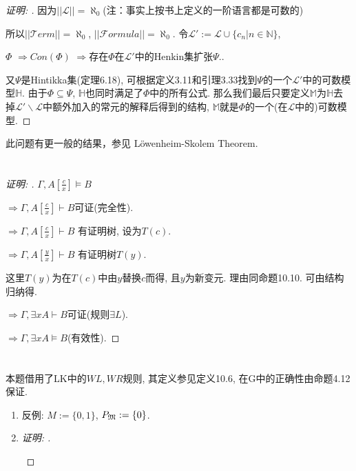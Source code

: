 \documentclass{article}
\begin{document}
\begin{CJK*}{UTF8}{gbsn}
\begin{proof}[\emph{证明: }]
因为$||\mathscr{L}|| = \aleph_0$(注：事实上按书上定义的一阶语言都是可数的)

所以$||\mathcal{T}erm|| = \aleph_0$, $||\mathcal{F}ormula|| = \aleph_0$. 
令$\mathscr{L'} := \mathscr{L} \cup \{c_n | n \in \mathbb{N}\}$,

$\Phi$
$\Rightarrow Con(\Phi)$
$\Rightarrow \text{存在}\Phi\text{在}\mathscr{L'}\text{中的Henkin集扩张}\Psi. $. 

又$\Psi$是Hintikka集(定理6.18), 可根据定义3.11和引理3.33找到$\Psi$的一个$\mathscr{L'}$中的可数模型$\mathbb{H}$. 由于$\Phi \subseteq \Psi$, $\mathbb{H}$也同时满足了$\Phi$中的所有公式. 那么我们最后只要定义$\mathbb{M}$为$\mathbb{H}$去掉$\mathscr{L'} \backslash \mathscr{L}$中额外加入的常元的解释后得到的结构, $\mathbb{M}$就是$\Phi$的一个(在$\mathscr{L}$中的)可数模型. 
\end{proof}

此问题有更一般的结果，参见 L\"owenheim-Skolem Theorem. 
\section{}
\begin{proof}[\emph{证明: }]

$\Gamma , A[\frac{c}{x}] \models B$

 $\Rightarrow \Gamma , A[\frac{c}{x}] \vdash B$可证(完全性). 

$\Rightarrow \Gamma , A[\frac{c}{x}] \vdash B$ 有证明树, 设为$T(c)$. 

$\Rightarrow \Gamma , A[\frac{y}{x}] \vdash B$ 有证明树$T(y)$. 

这里$T(y)$为在$T(c)$中由$y$替换$c$而得, 且$y$为新变元. 理由同命题10.10. 可由结构归纳得. 

$\Rightarrow\Gamma , \exists xA\vdash B$可证(规则$\exists L$). 

$\Rightarrow \Gamma  , \exists xA\models B$(有效性). 
\end{proof}
\section{}
本题借用了LK中的$WL,WR$规则, 其定义参见定义10.6, 在G中的正确性由命题4.12保证. 
\begin{enumerate}[(1)]
\item 反例: $M:=\{0,1\}$, $P_{\frak{M}}:=\{0\}$. 
\item 
		
\begin{proof}[\emph{证明: }] ~
\begin{prooftree}


\end{prooftree}
\end{proof}
\end{enumerate}
\end{CJK*}
\end{document}
